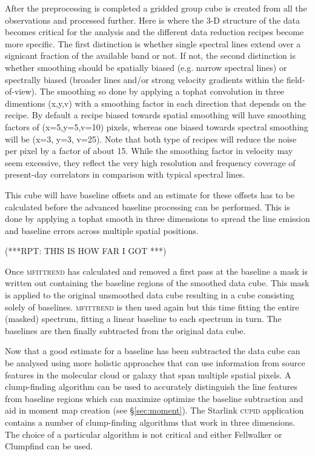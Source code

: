 \documentclass[final,authoryear,5p,times,twocolumn]{elsarticle}
\begin{document}
After the preprocessing is completed a gridded group cube is created
from all the observations and processed further. Here is where the 3-D
structure of the data becomes critical for the analysis and the
different data reduction recipes become more specific. The first
distinction is whether single spectral lines extend over a signicant
fraction of the available band or not. If not, the second distinction
is whether smoothing should be spatially biased (e.g. narrow spectral
lines) or spectrally biased (broader lines and/or strong velocity
gradients within the field-of-view). The smoothing so done by applying
a tophat convolution in three dimentions (x,y,v) with a smoothing
factor in each direction that depends on the recipe.  By default a
recipe biased towards spatial smoothing will have smoothing factors of
(x=5,y=5,v=10) pixels, whereas one biased towards spectral smoothing
will be (x=3, y=3, v=25). Note that both type of recipes will reduce
the noise per pixel by a factor of about 15. While the smoothing
factor in velocity may seem excessive, they reflect the very high
resolution and frequency coverage of present-day correlators in
comparison with typical spectral lines.






This cube will have baseline offsets and an estimate for these offsets
has to be calculated before the advanced baseline processing can be
performed. This is done by applying a tophat smooth in three
dimensions to spread the line emission and baseline errors across
multiple spatial positions.


{\color{red}(***RPT: THIS IS HOW FAR I GOT ***)}

Once \textsc{mfittrend} has calculated and removed a first pass at the
baseline a mask is written out containing the baseline regions of the
smoothed data cube. This mask is applied to the original
unsmoothed data cube resulting in a cube consisting solely of
baselines. \textsc{mfittrend} is then used again but this time fitting
the entire (masked) spectrum, fitting a linear baseline to each
spectrum in turn. The baselines are then finally subtracted from the
original data cube.

Now that a good estimate for a baseline has been subtracted the data
cube can be analysed using more holistic approaches that can use
information from source features in the molecular cloud or galaxy that
span multiple spatial pixels. A clump-finding algorithm can be used to
accurately distinguish the line features from baseline regions which
can maximize optimize the baseline subtraction and aid in moment map
creation (see \S \ref{sec:moment}). The Starlink \textsc{cupid}
\citep{2007ASPC..376..425B} application contains a number of
clump-finding algorithms that work in three dimensions. The choice of
a particular algorithm is not critical and either Fellwalker or
Clumpfind \citep{1994ApJ...428..693W} can be used.
\end{document}
